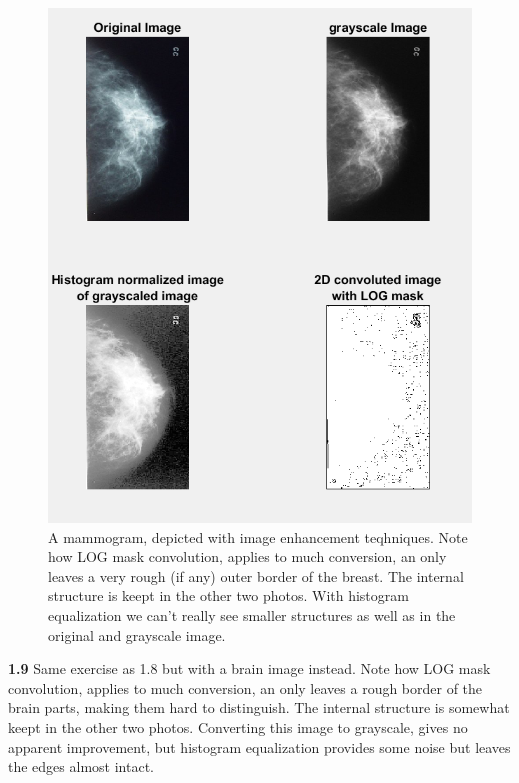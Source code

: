 \documentclass[]{article}
\begin{document}
\begin{figure}[H]
\centering
\includegraphics[scale=0.75]{Mammo.PNG}
\caption{A mammogram, depicted with image enhancement teqhniques. Note how LOG mask convolution, applies to much conversion, an only leaves a very rough (if any) outer border of the breast. The internal structure is keept in the other two photos. With histogram equalization we can't really see smaller structures as well as in the original and grayscale image.}
\end{figure}
\textbf{1.9}
Same exercise as 1.8 but with a brain image instead. Note how LOG mask convolution, applies to much conversion, an only leaves a rough border of the brain parts, making them hard to distinguish. The internal structure is somewhat keept in the other two photos. Converting this image to grayscale, gives no apparent improvement, but histogram equalization provides some noise but leaves the edges almost intact.\\\\
\end{document}
